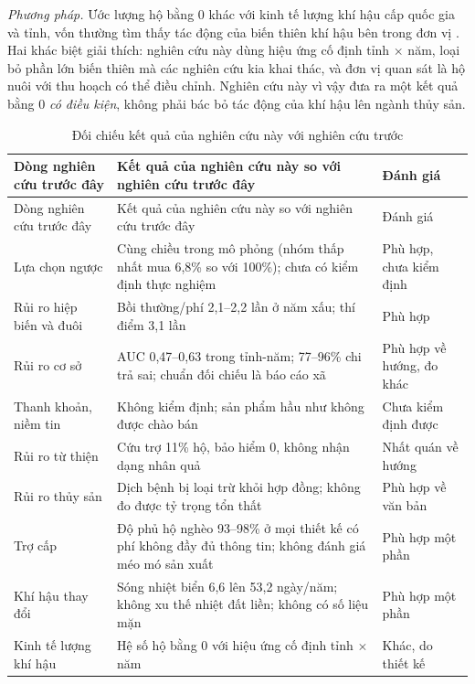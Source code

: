 \documentclass[12pt,a4paper]{article}
\begin{document}
\textit{Phương pháp.} Ước lượng hộ bằng 0 khác với kinh tế lượng khí hậu cấp quốc gia và tỉnh, vốn thường tìm thấy tác động của biến thiên khí hậu bên trong đơn vị \parencite{dell2014,hsiang2016}. Hai khác biệt giải thích: nghiên cứu này dùng hiệu ứng cố định tỉnh $\times$ năm, loại bỏ phần lớn biến thiên mà các nghiên cứu kia khai thác, và đơn vị quan sát là hộ nuôi với thu hoạch có thể điều chỉnh. Nghiên cứu này vì vậy đưa ra một kết quả bằng 0 \emph{có điều kiện}, không phải bác bỏ tác động của khí hậu lên ngành thủy sản.

\begingroup\footnotesize
\begin{longtable}{@{}>{\raggedright\arraybackslash}p{3.3cm}>{\raggedright\arraybackslash}p{8.2cm}>{\raggedright\arraybackslash}p{3.2cm}@{}}
\caption{Đối chiếu kết quả của nghiên cứu này với nghiên cứu trước}\label{tab:lit}\\
\toprule
Dòng nghiên cứu trước đây & Kết quả của nghiên cứu này so với nghiên cứu trước đây & Đánh giá \\
\midrule\endfirsthead
\toprule Dòng nghiên cứu trước đây & Kết quả của nghiên cứu này so với nghiên cứu trước đây & Đánh giá \\ \midrule\endhead
\bottomrule\endfoot
Lựa chọn ngược \parencite{rothschild1976,einav2011} & Cùng chiều trong mô phỏng (nhóm thấp nhất mua 6,8\% so với 100\%); chưa có kiểm định thực nghiệm & Phù hợp, chưa kiểm định \\
Rủi ro hiệp biến và đuôi \parencite{townsend1994,kunreuther1996} & Bồi thường/phí 2,1--2,2 lần ở năm xấu; thí điểm 3,1 lần & Phù hợp \\
Rủi ro cơ sở \parencite{clarke2016,jensen2016} & AUC 0,47--0,63 trong tỉnh-năm; 77--96\% chi trả sai; chuẩn đối chiếu là báo cáo xã & Phù hợp về hướng, đo khác \\
Thanh khoản, niềm tin \parencite{casaburi2018,gine2008} & Không kiểm định; sản phẩm hầu như không được chào bán & Chưa kiểm định được \\
Rủi ro từ thiện \parencite{coate1995,kousky2018} & Cứu trợ 11\% hộ, bảo hiểm 0, không nhận dạng nhân quả & Nhất quán về hướng \\
Rủi ro thủy sản \parencite{bergfjord2009,lecheong2010} & Dịch bệnh bị loại trừ khỏi hợp đồng; không đo được tỷ trọng tổn thất & Phù hợp về văn bản \\
Trợ cấp \parencite{binswanger2012,goodwin2013} & Độ phủ hộ nghèo 93--98\% ở mọi thiết kế có phí không đầy đủ thông tin; không đánh giá méo mó sản xuất & Phù hợp một phần \\
Khí hậu thay đổi \parencite{oliver2018,eslami2019} & Sóng nhiệt biển 6,6 lên 53,2 ngày/năm; không xu thế nhiệt đất liền; không có số liệu mặn & Phù hợp một phần \\
Kinh tế lượng khí hậu \parencite{dell2014,hsiang2016} & Hệ số hộ bằng 0 với hiệu ứng cố định tỉnh $\times$ năm & Khác, do thiết kế \\
\end{longtable}
\endgroup
{}
\end{document}
